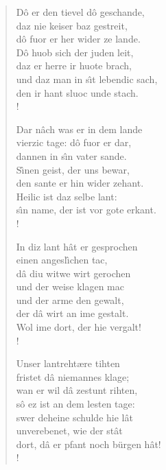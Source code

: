 \documentclass[11pt]{article}
\begin{document}
\begin{verse}
\begin{multicols}{2}
%
\begin{stanza}
D\^o er den tievel d\^o geschande,\\
daz nie keiser baz gestreit,\\
d\^o fuor er her wider ze lande.\\
D\^o huob sich der juden leit,\\ 
daz er herre ir huote brach,\\ 
und daz man in s\^\i t lebendic sach,\\ 
den ir hant sluoc unde stach.\\!
\end{stanza} 
%
%
\begin{stanza}
Dar n\^ach was er in dem lande\\
vierzic tage: d\^o fuor er dar,\\
dannen in s\^\i n vater sande.\\
S\^\i nen geist, der uns bewar,\\
den sante er hin wider zehant.\\
Heilic ist daz selbe lant:\\
s\^\i n name, der ist vor gote erkant.\\!
\end{stanza} 
%
%
\begin{stanza}
In diz lant h\^at er gesprochen\\
einen angesl\^\i chen tac,\\
d\^a diu witwe wirt gerochen\\
und der weise klagen mac\\
und der arme den gewalt,\\
der d\^a wirt an ime gestalt.\\
Wol ime dort, der hie vergalt!\\!
\end{stanza} 
%
%
\begin{stanza}
Unser lantreht\ae re tihten\\
fristet d\^a niemannes klage;\\
wan er wil d\^a zestunt rihten,\\
s\^o ez ist an dem lesten tage:\\
swer deheine schulde hie l\^at\\
unverebenet, wie der st\^at\\
dort, d\^a er pfant noch b\"urgen h\^at!\\!
\end{stanza} 
%
%
\begin{stanza}

\end{stanza}
\end{multicols}
\end{verse}
\end{document}
